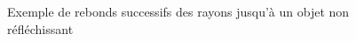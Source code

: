 \documentclass[11pt]{article}
\begin{document}
\begin{appendices}
\begin{figure}[!h]
			\caption{Exemple de rebonds successifs des rayons jusqu'à un objet non réfléchissant}
			\label{reflectionsSchema}
		\end{figure}
		\FloatBarrier
		\label{annexe:reflexionsRecursives}
\FloatBarrier
\end{appendices}

\newpage%
\nocite{*}


\end{document}
